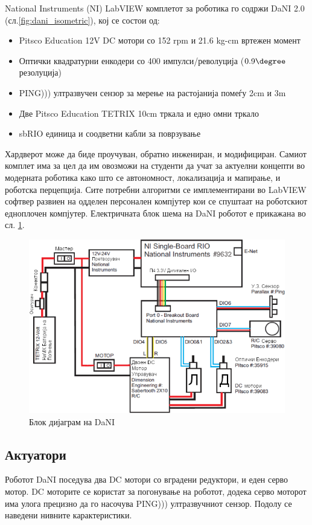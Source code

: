 \documentclass[11pt]{article}
\begin{document}
	National Instruments (NI) LabVIEW комплетот за роботика го содржи DaNI 2.0 (сл.\ref{fig:dani_isometric}), кој се состои од:

	\begin{itemize}
		\item Pitsco Education 12V DC мотори со 152 rpm и 21.6 kg-cm вртежен момент
		\item Оптички квадратурни енкодери со 400 импулси/револуција ($0.9\degree$ резолуција)
		\item PING))) ултразвучен сензор за мерење на растојанија помеѓу 2cm и 3m
		\item Две Pitsco Education TETRIX 10cm тркала и едно омни тркало
		\item sbRIO единица и соодветни кабли за поврзување
		\end{itemize}

	Хардверот може да биде проучуван, обратно инжениран, и модифициран. Самиот комплет има за цел да им овозможи на студенти да учат за актуелни концепти во модерната роботика како што се автономност, локализација и мапирање, и роботска перцепција. Сите потребни алгоритми се имплементирани во LabVIEW софтвер развиен на одделен персонален компјутер кои се спуштаат на роботскиот едноплочен компјутер. Електричната блок шема на DaNI роботот е прикажана во сл. \ref{fig:dani_block_diagram}.

	\begin{figure}[H]
		\includegraphics[width=0.75\linewidth]{./images/dani_block_diagram_mk_trans.png}
		\centering
		\caption{Блок дијаграм на DaNI}
		\label{fig:dani_block_diagram}
		\end{figure}

	\subsection{Актуатори}
		Роботот DaNI поседува два DC мотори со вградени редуктори, и еден серво мотор. DC моторите се користат за погонување на роботот, додека серво моторот има улога прецизно да го насочува PING))) ултразвучниот сензор. Подолу се наведени нивните карактеристики.
\end{document}
